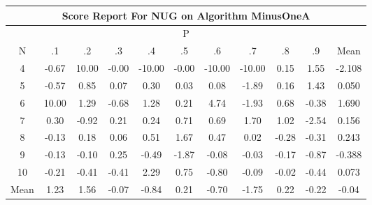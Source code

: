 \documentclass[11pt,a4paper]{report}
\begin{document}
\begin{longtable}{ | c || c | c | c | c | c | c | c | c | c || c |}
\hline
\multicolumn{11}{|c|}{ Score Report For NUG on Algorithm MinusOneA} \\
\hline
\multicolumn{11}{|c|}{ P } \\
\hline
N & .1 & .2 & .3 & .4 & .5 & .6 & .7 & .8 & .9 & Mean\\
 \hline
 \hline
 \endhead
  4 &  \cellcolor[HTML]{FFEFEF} -0.67 &  \cellcolor[HTML]{0808FF} 10.00 &  \cellcolor[HTML]{FFFFFF} -0.00 &  \cellcolor[HTML]{FF0000} -10.00 &  \cellcolor[HTML]{FFFFFF} -0.00 &  \cellcolor[HTML]{FF0000} -10.00 &  \cellcolor[HTML]{FF0000} -10.00 &  \cellcolor[HTML]{FFFFFF} 0.15 &  \cellcolor[HTML]{D7D7FF} 1.55 & -2.108 \\
  5 &  \cellcolor[HTML]{FFEFEF} -0.57 &  \cellcolor[HTML]{E7E7FF} 0.85 &  \cellcolor[HTML]{FFFFFF} 0.07 &  \cellcolor[HTML]{F7F7FF} 0.30 &  \cellcolor[HTML]{FFFFFF} 0.03 &  \cellcolor[HTML]{FFFFFF} 0.08 &  \cellcolor[HTML]{FFCFCF} -1.89 &  \cellcolor[HTML]{F7F7FF} 0.16 &  \cellcolor[HTML]{D7D7FF} 1.43 & 0.050 \\
  6 &  \cellcolor[HTML]{0808FF} 10.00 &  \cellcolor[HTML]{DFDFFF} 1.29 &  \cellcolor[HTML]{FFEFEF} -0.68 &  \cellcolor[HTML]{DFDFFF} 1.28 &  \cellcolor[HTML]{F7F7FF} 0.21 &  \cellcolor[HTML]{8787FF} 4.74 &  \cellcolor[HTML]{FFCFCF} -1.93 &  \cellcolor[HTML]{EFEFFF} 0.68 &  \cellcolor[HTML]{FFF7F7} -0.38 & 1.690 \\
  7 &  \cellcolor[HTML]{F7F7FF} 0.30 &  \cellcolor[HTML]{FFE7E7} -0.92 &  \cellcolor[HTML]{F7F7FF} 0.21 &  \cellcolor[HTML]{F7F7FF} 0.24 &  \cellcolor[HTML]{EFEFFF} 0.71 &  \cellcolor[HTML]{EFEFFF} 0.69 &  \cellcolor[HTML]{D7D7FF} 1.70 &  \cellcolor[HTML]{E7E7FF} 1.02 &  \cellcolor[HTML]{FFBFBF} -2.54 & 0.156 \\
  8 &  \cellcolor[HTML]{FFFFFF} -0.13 &  \cellcolor[HTML]{F7F7FF} 0.18 &  \cellcolor[HTML]{FFFFFF} 0.06 &  \cellcolor[HTML]{EFEFFF} 0.51 &  \cellcolor[HTML]{D7D7FF} 1.67 &  \cellcolor[HTML]{F7F7FF} 0.47 &  \cellcolor[HTML]{FFFFFF} 0.02 &  \cellcolor[HTML]{FFF7F7} -0.28 &  \cellcolor[HTML]{FFF7F7} -0.31 & 0.243 \\
  9 &  \cellcolor[HTML]{FFFFFF} -0.13 &  \cellcolor[HTML]{FFFFFF} -0.10 &  \cellcolor[HTML]{F7F7FF} 0.25 &  \cellcolor[HTML]{FFEFEF} -0.49 &  \cellcolor[HTML]{FFCFCF} -1.87 &  \cellcolor[HTML]{FFFFFF} -0.08 &  \cellcolor[HTML]{FFFFFF} -0.03 &  \cellcolor[HTML]{FFF7F7} -0.17 &  \cellcolor[HTML]{FFE7E7} -0.87 & -0.388 \\
  10 &  \cellcolor[HTML]{FFF7F7} -0.21 &  \cellcolor[HTML]{FFF7F7} -0.41 &  \cellcolor[HTML]{FFF7F7} -0.41 &  \cellcolor[HTML]{C7C7FF} 2.29 &  \cellcolor[HTML]{EFEFFF} 0.75 &  \cellcolor[HTML]{FFE7E7} -0.80 &  \cellcolor[HTML]{FFFFFF} -0.09 &  \cellcolor[HTML]{FFFFFF} -0.02 &  \cellcolor[HTML]{FFF7F7} -0.44 & 0.073 \\
 \hline
 \hline
Mean &  \cellcolor[HTML]{DFDFFF} 1.23 &  \cellcolor[HTML]{D7D7FF} 1.56 &  \cellcolor[HTML]{FFFFFF} -0.07 &  \cellcolor[HTML]{FFE7E7} -0.84 &  \cellcolor[HTML]{F7F7FF} 0.21 &  \cellcolor[HTML]{FFEFEF} -0.70 &  \cellcolor[HTML]{FFCFCF} -1.75 &  \cellcolor[HTML]{F7F7FF} 0.22 &  \cellcolor[HTML]{FFF7F7} -0.22 &  \cellcolor[HTML]{FFFFFF} -0.04
\end{longtable}
\end{document}
